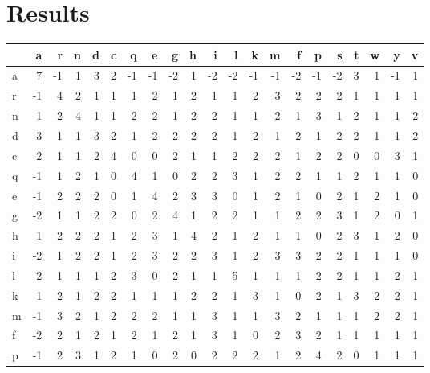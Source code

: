 \documentclass[a4paper,11pt]{article}
\begin{document}
\section{Results}

\begin{table}[!hbp]
	\centering
	\begin{tabular}{l|*{20}{r} }
		& a  & r  & n & d & c & q  & e  & g  & h & i  & l  & k  & m  & f  & p  & s  & t & w & y  & v \\ \hline
		a & 7  & -1 & 1 & 3 & 2 & -1 & -1 & -2 & 1 & -2 & -2 & -1 & -1 & -2 & -1 & -2 & 3 & 1 & -1 & 1 \\
		r & -1 & 4  & 2 & 1 & 1 & 1  & 2  & 1  & 2 & 1  & 1  & 2  & 3  & 2  & 2  & 2  & 1 & 1 & 1  & 1 \\
		n & 1  & 2  & 4 & 1 & 1 & 2  & 2  & 1  & 2 & 2  & 1  & 1  & 2  & 1  & 3  & 1  & 2 & 1 & 1  & 2 \\
		d & 3  & 1  & 1 & 3 & 2 & 1  & 2  & 2  & 2 & 2  & 1  & 2  & 1  & 2  & 1  & 2  & 2 & 1 & 1  & 2 \\
		c & 2  & 1  & 1 & 2 & 4 & 0  & 0  & 2  & 1 & 1  & 2  & 2  & 2  & 1  & 2  & 2  & 0 & 0 & 3  & 1 \\
		q & -1 & 1  & 2 & 1 & 0 & 4  & 1  & 0  & 2 & 2  & 3  & 1  & 2  & 2  & 1  & 1  & 2 & 1 & 1  & 0 \\
		e & -1 & 2  & 2 & 2 & 0 & 1  & 4  & 2  & 3 & 3  & 0  & 1  & 2  & 1  & 0  & 2  & 1 & 2 & 1  & 0 \\
		g & -2 & 1  & 1 & 2 & 2 & 0  & 2  & 4  & 1 & 2  & 2  & 1  & 1  & 2  & 2  & 3  & 1 & 2 & 0  & 1 \\
		h & 1  & 2  & 2 & 2 & 1 & 2  & 3  & 1  & 4 & 2  & 1  & 2  & 1  & 1  & 0  & 2  & 3 & 1 & 2  & 0 \\
		i & -2 & 1  & 2 & 2 & 1 & 2  & 3  & 2  & 2 & 3  & 1  & 2  & 3  & 3  & 2  & 2  & 1 & 1 & 1  & 0 \\
		l & -2 & 1  & 1 & 1 & 2 & 3  & 0  & 2  & 1 & 1  & 5  & 1  & 1  & 1  & 2  & 2  & 1 & 1 & 2  & 1 \\
		k & -1 & 2  & 1 & 2 & 2 & 1  & 1  & 1  & 2 & 2  & 1  & 3  & 1  & 0  & 2  & 1  & 3 & 2 & 2  & 1 \\
		m & -1 & 3  & 2 & 1 & 2 & 2  & 2  & 1  & 1 & 3  & 1  & 1  & 3  & 2  & 1  & 1  & 1 & 2 & 2  & 1 \\
		f & -2 & 2  & 1 & 2 & 1 & 2  & 1  & 2  & 1 & 3  & 1  & 0  & 2  & 3  & 2  & 1  & 1 & 1 & 1  & 1 \\
		p & -1 & 2  & 3 & 1 & 2 & 1  & 0  & 2  & 0 & 2  & 2  & 2  & 1  & 2  & 4  & 2  & 0 & 1 & 1  & 1 \\

\end{tabular}
\end{table}
\end{document}
